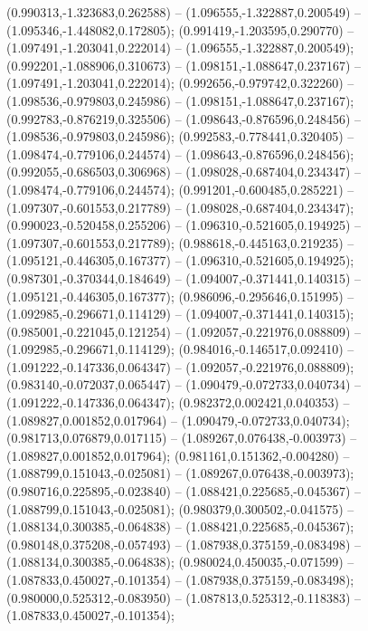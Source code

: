  (0.990313,-1.323683,0.262588) -- (1.096555,-1.322887,0.200549) -- (1.095346,-1.448082,0.172805);
 (0.991419,-1.203595,0.290770) -- (1.097491,-1.203041,0.222014) -- (1.096555,-1.322887,0.200549);
 (0.992201,-1.088906,0.310673) -- (1.098151,-1.088647,0.237167) -- (1.097491,-1.203041,0.222014);
 (0.992656,-0.979742,0.322260) -- (1.098536,-0.979803,0.245986) -- (1.098151,-1.088647,0.237167);
 (0.992783,-0.876219,0.325506) -- (1.098643,-0.876596,0.248456) -- (1.098536,-0.979803,0.245986);
 (0.992583,-0.778441,0.320405) -- (1.098474,-0.779106,0.244574) -- (1.098643,-0.876596,0.248456);
 (0.992055,-0.686503,0.306968) -- (1.098028,-0.687404,0.234347) -- (1.098474,-0.779106,0.244574);
 (0.991201,-0.600485,0.285221) -- (1.097307,-0.601553,0.217789) -- (1.098028,-0.687404,0.234347);
 (0.990023,-0.520458,0.255206) -- (1.096310,-0.521605,0.194925) -- (1.097307,-0.601553,0.217789);
 (0.988618,-0.445163,0.219235) -- (1.095121,-0.446305,0.167377) -- (1.096310,-0.521605,0.194925);
 (0.987301,-0.370344,0.184649) -- (1.094007,-0.371441,0.140315) -- (1.095121,-0.446305,0.167377);
 (0.986096,-0.295646,0.151995) -- (1.092985,-0.296671,0.114129) -- (1.094007,-0.371441,0.140315);
 (0.985001,-0.221045,0.121254) -- (1.092057,-0.221976,0.088809) -- (1.092985,-0.296671,0.114129);
 (0.984016,-0.146517,0.092410) -- (1.091222,-0.147336,0.064347) -- (1.092057,-0.221976,0.088809);
 (0.983140,-0.072037,0.065447) -- (1.090479,-0.072733,0.040734) -- (1.091222,-0.147336,0.064347);
 (0.982372,0.002421,0.040353) -- (1.089827,0.001852,0.017964) -- (1.090479,-0.072733,0.040734);
 (0.981713,0.076879,0.017115) -- (1.089267,0.076438,-0.003973) -- (1.089827,0.001852,0.017964);
 (0.981161,0.151362,-0.004280) -- (1.088799,0.151043,-0.025081) -- (1.089267,0.076438,-0.003973);
 (0.980716,0.225895,-0.023840) -- (1.088421,0.225685,-0.045367) -- (1.088799,0.151043,-0.025081);
 (0.980379,0.300502,-0.041575) -- (1.088134,0.300385,-0.064838) -- (1.088421,0.225685,-0.045367);
 (0.980148,0.375208,-0.057493) -- (1.087938,0.375159,-0.083498) -- (1.088134,0.300385,-0.064838);
 (0.980024,0.450035,-0.071599) -- (1.087833,0.450027,-0.101354) -- (1.087938,0.375159,-0.083498);
 (0.980000,0.525312,-0.083950) -- (1.087813,0.525312,-0.118383) -- (1.087833,0.450027,-0.101354);

